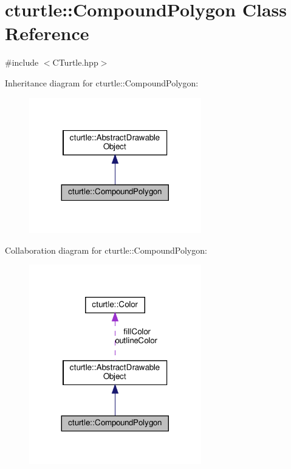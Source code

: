 \hypertarget{classcturtle_1_1CompoundPolygon}{}\section{cturtle\+:\+:Compound\+Polygon Class Reference}
\label{classcturtle_1_1CompoundPolygon}


{\ttfamily \#include $<$C\+Turtle.\+hpp$>$}



Inheritance diagram for cturtle\+:\+:Compound\+Polygon\+:
\nopagebreak
\begin{figure}[H]
\begin{center}
\leavevmode
\includegraphics[width=212pt]{classcturtle_1_1CompoundPolygon__inherit__graph}
\end{center}
\end{figure}


Collaboration diagram for cturtle\+:\+:Compound\+Polygon\+:
\nopagebreak
\begin{figure}[H]
\begin{center}
\leavevmode
\includegraphics[width=212pt]{classcturtle_1_1CompoundPolygon__coll__graph}
\end{center}
\end{figure}
